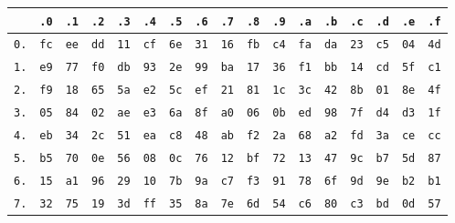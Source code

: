 {
  \renewcommand\arraystretch{0.9}
  \setlength{\tabcolsep}{2pt}
  \tiny
  \begin{table}[ht!]
    \centering
    \begin{tabular}{r|llllllllllllllll}
      & \texttt{.0} & \texttt{.1} & \texttt{.2} & \texttt{.3} & \texttt{.4} & \texttt{.5} & \texttt{.6} & \texttt{.7} & \texttt{.8} & \texttt{.9} & \texttt{.a} & \texttt{.b} & \texttt{.c} & \texttt{.d} & \texttt{.e} & \texttt{.f}\\
      \hline
      \texttt{0.} & \texttt{fc} & \texttt{ee} & \texttt{dd} & \texttt{11} & \texttt{cf} & \texttt{6e} & \texttt{31} & \texttt{16} & \texttt{fb} & \texttt{c4} & \texttt{fa} & \texttt{da} & \texttt{23} & \texttt{c5} & \texttt{04} & \texttt{4d}\\
      \texttt{1.} & \texttt{e9} & \texttt{77} & \texttt{f0} & \texttt{db} & \texttt{93} & \texttt{2e} & \texttt{99} & \texttt{ba} & \texttt{17} & \texttt{36} & \texttt{f1} & \texttt{bb} & \texttt{14} & \texttt{cd} & \texttt{5f} & \texttt{c1}\\
      \texttt{2.} & \texttt{f9} & \texttt{18} & \texttt{65} & \texttt{5a} & \texttt{e2} & \texttt{5c} & \texttt{ef} & \texttt{21} & \texttt{81} & \texttt{1c} & \texttt{3c} & \texttt{42} & \texttt{8b} & \texttt{01} & \texttt{8e} & \texttt{4f}\\
      \texttt{3.} & \texttt{05} & \texttt{84} & \texttt{02} & \texttt{ae} & \texttt{e3} & \texttt{6a} & \texttt{8f} & \texttt{a0} & \texttt{06} & \texttt{0b} & \texttt{ed} & \texttt{98} & \texttt{7f} & \texttt{d4} & \texttt{d3} & \texttt{1f}\\
      \texttt{4.} & \texttt{eb} & \texttt{34} & \texttt{2c} & \texttt{51} & \texttt{ea} & \texttt{c8} & \texttt{48} & \texttt{ab} & \texttt{f2} & \texttt{2a} & \texttt{68} & \texttt{a2} & \texttt{fd} & \texttt{3a} & \texttt{ce} & \texttt{cc}\\
      \texttt{5.} & \texttt{b5} & \texttt{70} & \texttt{0e} & \texttt{56} & \texttt{08} & \texttt{0c} & \texttt{76} & \texttt{12} & \texttt{bf} & \texttt{72} & \texttt{13} & \texttt{47} & \texttt{9c} & \texttt{b7} & \texttt{5d} & \texttt{87}\\
      \texttt{6.} & \texttt{15} & \texttt{a1} & \texttt{96} & \texttt{29} & \texttt{10} & \texttt{7b} & \texttt{9a} & \texttt{c7} & \texttt{f3} & \texttt{91} & \texttt{78} & \texttt{6f} & \texttt{9d} & \texttt{9e} & \texttt{b2} & \texttt{b1}\\
      \texttt{7.} & \texttt{32} & \texttt{75} & \texttt{19} & \texttt{3d} & \texttt{ff} & \texttt{35} & \texttt{8a} & \texttt{7e} & \texttt{6d} & \texttt{54} & \texttt{c6} & \texttt{80} & \texttt{c3} & \texttt{bd} & \texttt{0d} & \texttt{57}\\

\end{tabular}
\end{table}}
